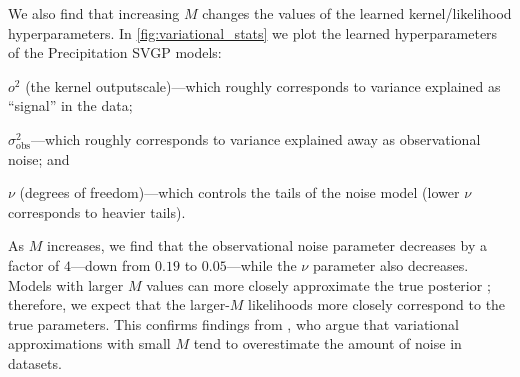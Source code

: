 We also find that increasing $M$ changes the values of the learned kernel/likelihood hyperparameters.
In \cref{fig:variational_stats} we plot the learned hyperparameters of the Precipitation SVGP models:
%
\begin{enumerate*}
  \item $o^2$ (the kernel outputscale)---which roughly corresponds to variance explained as ``signal'' in the data;
  \item $\sigma^2_\text{obs}$---which roughly corresponds to variance explained away as observational noise; and
  \item $\nu$ (degrees of freedom)---which controls the tails of the noise model (lower $\nu$ corresponds to heavier tails).
\end{enumerate*}
%
As $M$ increases, we find that the observational noise parameter decreases by a factor of $4$---down from $0.19$ to $0.05$---while the $\nu$ parameter also decreases.
Models with larger $M$ values can more closely approximate the true posterior \cite{hensman2013gaussian}; therefore, we expect that the larger-$M$ likelihoods more closely correspond to the true parameters.
This confirms findings from \citet{bauer2016understanding}, who argue that variational approximations with small $M$ tend to overestimate the amount of noise in datasets.
